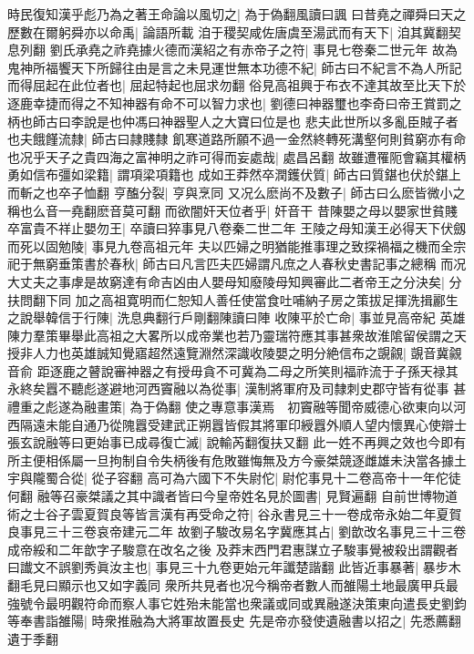 時民復知漢乎彪乃為之著王命論以風切之|{
	為于偽翻風讀曰諷}
曰昔堯之禪舜曰天之歷數在爾躬舜亦以命禹|{
	論語所載}
洎于稷契咸佐唐虞至湯武而有天下|{
	洎其冀翻契息列翻}
劉氏承堯之祚堯據火德而漢紹之有赤帝子之符|{
	事見七卷秦二世元年}
故為鬼神所福饗天下所歸往由是言之未見運世無本功德不紀|{
	師古曰不紀言不為人所記}
而得屈起在此位者也|{
	屈起特起也屈求勿翻}
俗見高祖興于布衣不達其故至比天下於逐鹿幸捷而得之不知神器有命不可以智力求也|{
	劉德曰神器璽也李奇曰帝王賞罰之柄也師古曰李說是也仲馮曰神器聖人之大寶曰位是也}
悲夫此世所以多亂臣賊子者也夫餓饉流隸|{
	師古曰隷賤隸}
飢寒道路所願不過一金然終轉死溝壑何則貧窮亦有命也况乎天子之貴四海之富神明之祚可得而妄處哉|{
	處昌呂翻}
故雖遭罹阨會竊其權柄勇如信布彊如梁籍|{
	謂項梁項籍也}
成如王莽然卒潤鑊伏質|{
	師古曰質鍖也伏於鍖上而斬之也卒子恤翻}
亨醢分裂|{
	亨與烹同}
又况么麽尚不及數子|{
	師古曰么麽皆微小之稱也么音一堯翻麽音莫可翻}
而欲闇奸天位者乎|{
	奸音干}
昔陳嬰之母以嬰家世貧賤卒富貴不祥止嬰勿王|{
	卒讀曰猝事見八卷秦二世二年}
王陵之母知漢王必得天下伏劔而死以固勉陵|{
	事見九卷高祖元年}
夫以匹婦之明猶能推事理之致探禍福之機而全宗祀于無窮垂策書於春秋|{
	師古曰凡言匹夫匹婦謂凡庶之人春秋史書記事之總稱}
而况大丈夫之事虖是故窮達有命吉凶由人嬰母知廢陵母知興審此二者帝王之分決矣|{
	分扶問翻下同}
加之高祖寛明而仁恕知人善任使當食吐哺納子房之策拔足揮洗揖酈生之說舉韓信于行陳|{
	洗息典翻行戶剛翻陳讀曰陣}
收陳平於亡命|{
	事並見高帝紀}
英雄陳力羣策畢舉此高祖之大畧所以成帝業也若乃靈瑞符應其事甚衆故淮隂留侯謂之天授非人力也英雄誠知覺寤超然遠覽淵然深識收陵嬰之明分絶信布之覬覦|{
	覬音冀覦音俞}
距逐鹿之瞽說審神器之有授毋貪不可冀為二母之所笑則福祚流于子孫天禄其永終矣囂不聽彪遂避地河西竇融以為從事|{
	漢制將軍府及司隸刺史郡守皆有從事}
甚禮重之彪遂為融畫策|{
	為于偽翻}
使之專意事漢焉　初竇融等聞帝威德心欲東向以河西隔遠未能自通乃從隗囂受建武正朔囂皆假其將軍印綬囂外順人望内懷異心使辯士張玄說融等曰更始事已成尋復亡滅|{
	說輸芮翻復扶又翻}
此一姓不再興之效也今即有所主便相係屬一旦拘制自令失柄後有危敗雖悔無及方今豪桀競逐雌雄未決當各據土宇與隴蜀合從|{
	從子容翻}
高可為六國下不失尉佗|{
	尉佗事見十二卷高帝十一年佗徒何翻}
融等召豪桀議之其中識者皆曰今皇帝姓名見於圖書|{
	見賢遍翻}
自前世博物道術之士谷子雲夏賀良等皆言漢有再受命之符|{
	谷永書見三十一卷成帝永始二年夏賀良事見三十三卷哀帝建元二年}
故劉子駿改易名字冀應其占|{
	劉歆改名事見三十三卷成帝綏和二年歆字子駿意在改名之後}
及莽末西門君惠謀立子駿事覺被殺出謂觀者曰䜟文不誤劉秀眞汝主也|{
	事見三十九卷更始元年讖楚諧翻}
此皆近事暴著|{
	暴步木翻毛見曰顯示也又如字義同}
衆所共見者也况今稱帝者數人而雒陽土地最廣甲兵最強號令最明觀符命而察人事它姓殆未能當也衆議或同或異融遂決策東向遣長史劉鈞等奉書詣雒陽|{
	時衆推融為大將軍故置長史}
先是帝亦發使遺融書以招之|{
	先悉薦翻遺于季翻}
